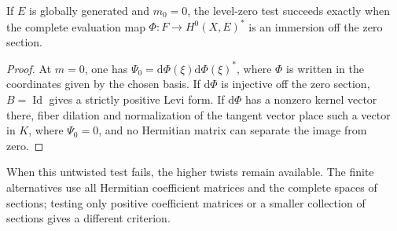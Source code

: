 \begin{corollary}\label{cor:untwisted-evaluation-immersion}
If $E$ is globally generated and $m_0=0$, the level-zero test succeeds exactly when the complete evaluation map $\Phi\colon F\to H^0(X,E)^*$ is an immersion off the zero section.
\end{corollary}
\begin{proof}
At $m=0$, one has $\Psi_0=\mathrm d\Phi(\xi)\mathrm d\Phi(\xi)^*$, where $\Phi$ is written in the coordinates given by the chosen basis. If $\mathrm d\Phi$ is injective off the zero section, $B=\operatorname{Id}$ gives a strictly positive Levi form. If $\mathrm d\Phi$ has a nonzero kernel vector there, fiber dilation and normalization of the tangent vector place such a vector in $K$, where $\Psi_0=0$, and no Hermitian matrix can separate the image from zero.
\end{proof}

When this untwisted test fails, the higher twists remain available. The finite alternatives use all Hermitian coefficient matrices and the complete spaces of sections; testing only positive coefficient matrices or a smaller collection of sections gives a different criterion.
